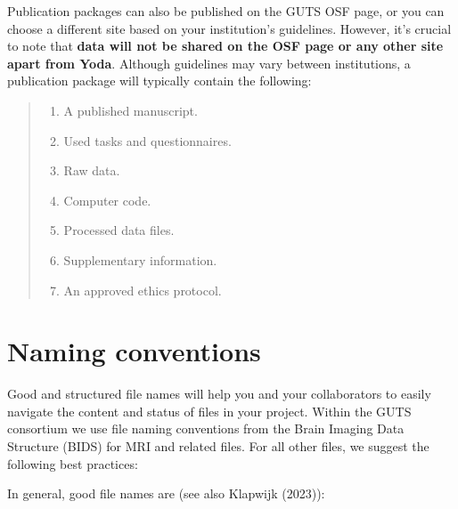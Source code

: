 \documentclass[
  letterpaper,
  DIV=11,
  numbers=noendperiod]{scrreprt}
\begin{document}
Publication packages can also be published on the GUTS OSF page, or you
can choose a different site based on your institution's guidelines.
However, it's crucial to note that \textbf{data will not be shared on
the OSF page or any other site apart from Yoda}. Although guidelines may
vary between institutions, a publication package will typically contain
the following:

\label{documentation-list-2}
\begin{quote}
\begin{enumerate}
\def\labelenumi{\arabic{enumi}.}
\item
  A published manuscript.
\item
  Used tasks and questionnaires.
\item
  Raw data.
\item
  Computer code.
\item
  Processed data files.
\item
  Supplementary information.
\item
  An approved ethics protocol.
\end{enumerate}
\end{quote}

\begin{tcolorbox}[enhanced jigsaw, arc=.35mm, left=2mm, colbacktitle=quarto-callout-note-color!10!white, bottomtitle=1mm, toptitle=1mm, titlerule=0mm, leftrule=.75mm, breakable, colframe=quarto-callout-note-color-frame, colback=white, opacitybacktitle=0.6, coltitle=black, opacityback=0, rightrule=.15mm, toprule=.15mm, bottomrule=.15mm, title={Coming soon: Guidelines per institute}]

\end{tcolorbox}

\chapter{Naming conventions}\label{naming-conventions}

Good and structured file names will help you and your collaborators to
easily navigate the content and status of files in your project. Within
the GUTS consortium we use file naming conventions from the Brain
Imaging Data Structure (BIDS) for MRI and related files. For all other
files, we suggest the following best practices:

In general, good file names are (see also Klapwijk (2023)):
\end{document}
